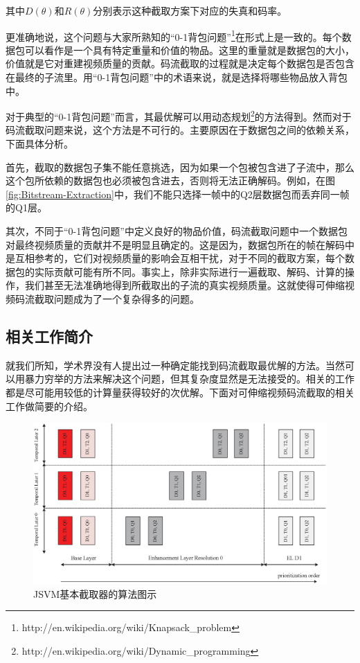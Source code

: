 其中$D(\theta)$和$R(\theta)$分别表示这种截取方案下对应的失真和码率。

更准确地说，这个问题与大家所熟知的“0-1背包问题”\footnote{http://en.wikipedia.org/wiki/Knapsack\_problem}在形式上是一致的。每个数据包可以看作是一个具有特定重量和价值的物品。这里的重量就是数据包的大小，价值就是它对重建视频质量的贡献。码流截取的过程就是决定每个数据包是否包含在最终的子流里。用“0-1背包问题”中的术语来说，就是选择将哪些物品放入背包中。

对于典型的“0-1背包问题”而言，其最优解可以用动态规划\footnote{http://en.wikipedia.org/wiki/Dynamic\_programming}的方法得到。然而对于码流截取问题来说，这个方法是不可行的。主要原因在于数据包之间的依赖关系，下面具体分析。

首先，截取的数据包子集不能任意挑选，因为如果一个包被包含进了子流中，那么这个包所依赖的数据包也必须被包含进去，否则将无法正确解码。例如，在图\ref{fig:Bitstream-Extraction}中，我们不能只选择一帧中的Q2层数据包而丢弃同一帧的Q1层。

其次，不同于“0-1背包问题”中定义良好的物品价值，码流截取问题中一个数据包对最终视频质量的贡献并不是明显且确定的。这是因为，数据包所在的帧在解码中是互相参考的，它们对视频质量的影响会互相干扰，对于不同的截取方案，每个数据包的实际贡献可能有所不同。事实上，除非实际进行一遍截取、解码、计算的操作，我们甚至无法准确地得到所截取出的子流的真实视频质量。这就使得可伸缩视频码流截取问题成为了一个复杂得多的问题。

\subsection{相关工作简介}

就我们所知，学术界没有人提出过一种确定能找到码流截取最优解的方法。当然可以用暴力穷举的方法来解决这个问题，但其复杂度显然是无法接受的。相关的工作都是尽可能用较低的计算量获得较好的次优解。下面对可伸缩视频码流截取的相关工作做简要的介绍。

\begin{figure}[h]
	\centering
	\vspace{10pt}
	\includegraphics[width = 1.0\linewidth]{eps/JSVM-basic}
	\caption{JSVM基本截取器的算法图示\label{fig:06}}
\end{figure}

